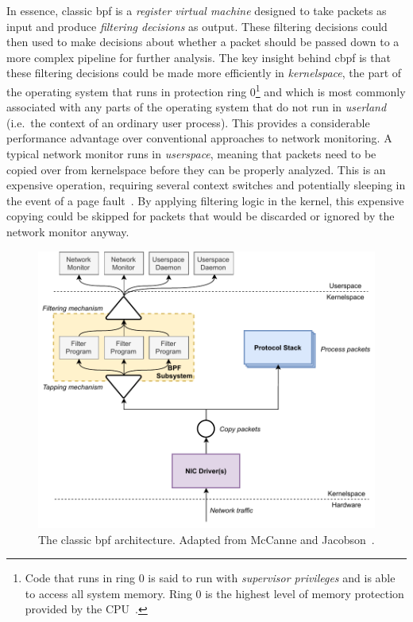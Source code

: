 In essence, classic \gls{bpf} is a \textit{register virtual machine} designed to take packets as
input and produce \textit{filtering decisions} as output. These filtering decisions could
then used to make decisions about whether a packet should be passed down to a more complex
pipeline for further analysis. The key insight behind \gls{cbpf} is that these filtering
decisions could be made more efficiently in \textit{kernelspace}, the part of the
operating system that runs in protection ring 0\footnote{Code that runs in ring 0 is said
to run with \textit{supervisor privileges} and is able to access all system memory. Ring
0 is the highest level of memory protection provided by the CPU~\cite{jaeger2008_os_security}.}
and which is most commonly associated with any parts of the operating system that do not
run in \textit{userland} (i.e.~the context of an ordinary user process). This provides
a considerable performance advantage over conventional approaches to network monitoring.
A typical network monitor runs in \textit{userspace}, meaning that packets need to be
copied over from kernelspace before they can be properly analyzed. This is an expensive
operation, requiring several context switches and potentially sleeping in the event of
a page fault~\cite{mccanne1993_bpf}.  By applying filtering logic in the kernel, this
expensive copying could be skipped for packets that would be discarded or ignored by the
network monitor anyway.

\begin{figure}[htbp]
  \centering
  \includegraphics[width=0.8\linewidth]{figs/background/classic-bpf.pdf}
  \caption[The classic BPF architecture]{The classic \gls{bpf} architecture. Adapted from McCanne and Jacobson~\cite{mccanne1993_bpf}.}%
  \label{fig:classic-bpf}
\end{figure}

